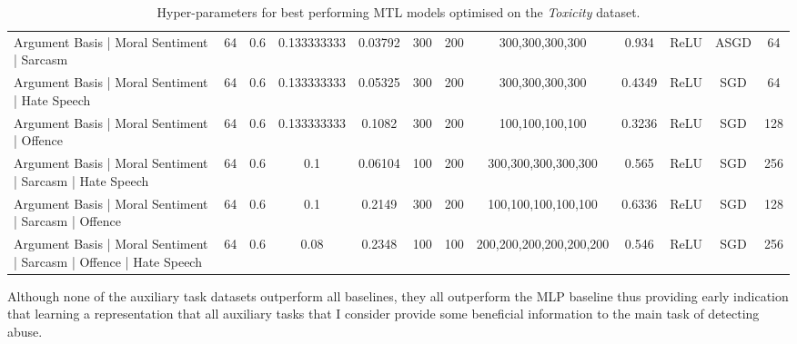 {\begin{landscape}
\begin{table}[]
{\begin{tabular}{l|ccccccccccc}
      Argument Basis | Moral Sentiment | Sarcasm                         & 64         & 0.6              & 0.133333333      & 0.03792 & 300           & 200    & 300,300,300,300         & 0.934         & ReLU          & ASGD      & 64         \\
      Argument Basis | Moral Sentiment | Hate Speech                     & 64         & 0.6              & 0.133333333      & 0.05325 & 300           & 200    & 300,300,300,300         & 0.4349        & ReLU          & SGD       & 64         \\
      Argument Basis | Moral Sentiment | Offence                         & 64         & 0.6              & 0.133333333      & 0.1082  & 300           & 200    & 100,100,100,100         & 0.3236        & ReLU          & SGD       & 128        \\
      Argument Basis | Moral Sentiment | Sarcasm | Hate Speech           & 64         & 0.6              & 0.1              & 0.06104 & 100           & 200    & 300,300,300,300,300     & 0.565         & ReLU          & SGD       & 256        \\
      Argument Basis | Moral Sentiment | Sarcasm | Offence               & 64         & 0.6              & 0.1              & 0.2149  & 300           & 200    & 100,100,100,100,100     & 0.6336        & ReLU          & SGD       & 128        \\
      Argument Basis | Moral Sentiment | Sarcasm | Offence | Hate Speech & 64         & 0.6              & 0.08             & 0.2348  & 100           & 100    & 200,200,200,200,200,200 & 0.546         & ReLU          & SGD       & 256
    \end{tabular}%
    }
    \caption{Hyper-parameters for best performing MTL models optimised on the \textit{Toxicity} dataset.}
    \label{tab:mtl_params_wulczyn}
  \end{table}
\end{landscape}
} %

Although none of the auxiliary task datasets outperform all baselines, they all outperform the MLP baseline thus providing early indication that learning a representation that all auxiliary tasks that I consider provide some beneficial information to the main task of detecting abuse.

